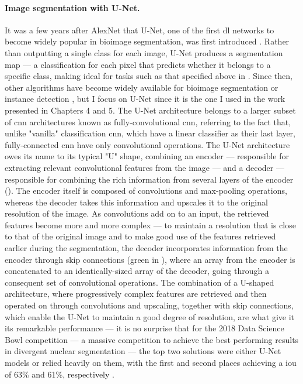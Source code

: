 \paragraph{Image segmentation with U-Net.} It was a few years after AlexNet that U-Net, one of the first \ac{dl} networks to become widely popular in bioimage segmentation, was first introduced \cite{Ronneberger2015-do}. Rather than outputting a single class for each image, U-Net produces a segmentation map --- a classification for each pixel that predicts whether it belongs to a specific class, making ideal for tasks such as that specified above in . Since then, other algorithms have become widely available for bioimage segmentation or instance detection \cite{Lucas2021-hc}, but I focus on U-Net since it is the one I used in the work presented in Chapters 4 and 5. The U-Net architecture belongs to a larger subset of \ac{cnn} architectures known as fully-convolutional \ac{cnn}, referring to the fact that, unlike "vanilla" classification \ac{cnn}, which have a linear classifier as their last layer, fully-connected \ac{cnn} have only convolutional operations. The U-Net architecture owes its name to its typical "U" shape, combining an encoder --- responsible for extracting relevant convolutional features from the image --- and a decoder --- responsible for combining the rich information from several layers of the encoder (). The encoder itself is composed of convolutions and max-pooling operations, whereas the decoder takes this information and upscales it to the original resolution of the image. As convolutions add on to an input, the retrieved features become more and more complex --- to maintain a resolution that is close to that of the original image and to make good use of the features retrieved earlier during the segmentation, the decoder incorporates information from the encoder through skip connections (green in ), where an array from the encoder is concatenated to an identically-sized array of the decoder, going through a consequent set of convolutional operations. The combination of a U-shaped architecture, where progressively complex features are retrieved and then operated on through convolutions and upscaling, together with skip connections, which enable the U-Net to maintain a good degree of resolution, are what give it its remarkable performance --- it is no surprise that for the 2018 Data Science Bowl competition --- a massive competition to achieve the best performing results in divergent nuclear segmentation --- the top two solutions were either U-Net models or relied heavily on them, with the first and second places achieving a \ac{iou} of 63\% and 61\%, respectively \cite{Seferbekov_undated-br,jacobkie_undated-tc}. 


